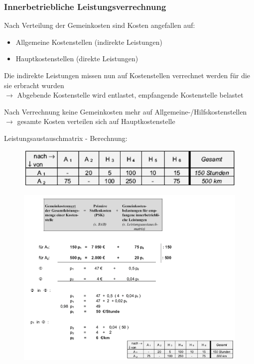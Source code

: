 \documentclass[a4paper,11pt, twoside]{article}
\begin{document}
\subsubsection*{Innerbetriebliche Leistungsverrechnung}
Nach Verteilung der Gemeinkosten sind Kosten angefallen auf:
\begin{itemize}
	\item Allgemeine Kostenstellen (indirekte Leistungen)
	\item Hauptkostenstellen (direkte Leistungen)
\end{itemize}

Die indirekte Leistungen missen nun auf Kostenstellen verrechnet werden für die sie erbracht wurden\\
$\rightarrow$ Abgebende Kostenstelle wird entlastet, empfangende Kostenstelle belastet

Nach Verrechnung keine Gemeinkosten mehr auf Allgemeine-/Hilfskostenstellen\\
$\rightarrow$ gesamte Kosten verteilen sich auf Hauptkostenstelle

Leistungsaustauschmatrix - Berechnung:

\begin{figure}[h]
 \begin{center}
   \includegraphics[scale=0.5]{bilder/leistungsaustauschmatrix.png}
 \end{center}
\end{figure}

\begin{figure}[h]
 \begin{center}
   \includegraphics[scale=0.5]{bilder/leistungsverechnung1.png}
 \end{center}
\end{figure}
\end{document}
